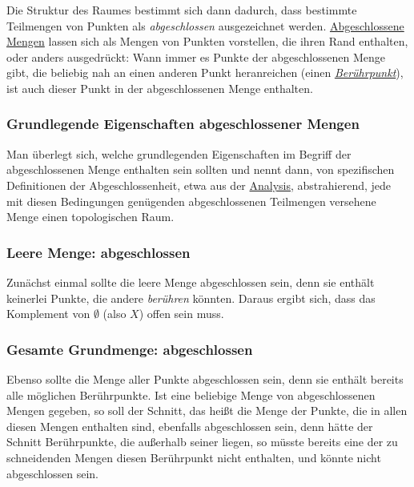 \documentclass[12pt,]{article}
\begin{document}
Die Struktur des Raumes bestimmt sich dann dadurch, dass bestimmte
Teilmengen von Punkten als \emph{abgeschlossen} ausgezeichnet werden.
\href{Abgeschlossene_Menge}{Abgeschlossene Mengen} lassen sich als
Mengen von Punkten vorstellen, die ihren Rand enthalten, oder anders
ausgedrückt: Wann immer es Punkte der abgeschlossenen Menge gibt, die
beliebig nah an einen anderen Punkt heranreichen (einen
\emph{\href{Rand_(Topologie)}{Berührpunkt}}), ist auch dieser Punkt in
der abgeschlossenen Menge enthalten.

\subsubsection{Grundlegende Eigenschaften abgeschlossener
Mengen}\label{grundlegende-eigenschaften-abgeschlossener-mengen}

Man überlegt sich, welche grundlegenden Eigenschaften im Begriff der
abgeschlossenen Menge enthalten sein sollten und nennt dann, von
spezifischen Definitionen der Abgeschlossenheit, etwa aus der
\url{Analysis}, abstrahierend, jede mit diesen Bedingungen genügenden
abgeschlossenen Teilmengen versehene Menge einen topologischen Raum.

\subsubsection{Leere Menge:
abgeschlossen}\label{leere-menge-abgeschlossen}

Zunächst einmal sollte die leere Menge abgeschlossen sein, denn sie
enthält keinerlei Punkte, die andere \emph{berühren} könnten. Daraus
ergibt sich, dass das Komplement von \(\emptyset\) (also \(X\)) offen
sein muss.

\subsubsection{Gesamte Grundmenge:
abgeschlossen}\label{gesamte-grundmenge-abgeschlossen}

Ebenso sollte die Menge aller Punkte abgeschlossen sein, denn sie
enthält bereits alle möglichen Berührpunkte. Ist eine beliebige Menge
von abgeschlossenen Mengen gegeben, so soll der Schnitt, das heißt die
Menge der Punkte, die in allen diesen Mengen enthalten sind, ebenfalls
abgeschlossen sein, denn hätte der Schnitt Berührpunkte, die außerhalb
seiner liegen, so müsste bereits eine der zu schneidenden Mengen diesen
Berührpunkt nicht enthalten, und könnte nicht abgeschlossen sein.
\end{document}
